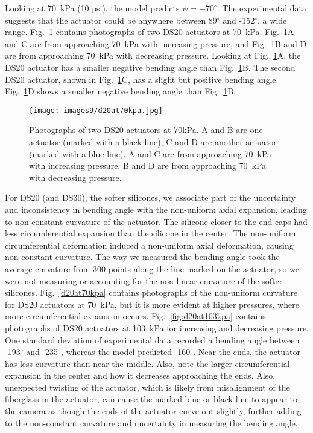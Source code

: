 Looking at 70~kPa (10 psi), the model predicts $\psi=-70^\circ$. The experimental data suggests that the actuator could be anywhere between 89$^\circ$ and -152$^\circ$, a wide range. Fig.~\ref{fig:d20at70kpa} contains photographs of two DS20 actuators at 70~kPa. Fig.~\ref{fig:d20at70kpa}A and C are from approaching 70~kPa with increasing pressure, and Fig.~\ref{fig:d20at70kpa}B and D are from approaching 70~kPa with decreasing pressure. Looking at Fig.~\ref{fig:d20at70kpa}A, the DS20 actuator has a smaller negative bending angle than Fig.~\ref{fig:d20at70kpa}B. The second DS20 actuator, shown in Fig.~\ref{fig:d20at70kpa}C, has a slight but positive bending angle. Fig.~\ref{fig:d20at70kpa}D shows a smaller negative bending angle than Fig.~\ref{fig:d20at70kpa}B. 

\begin{figure}[ht]
    \centering
     \texttt{[image: images9/d20at70kpa.jpg]}
    \caption{Photographs of two DS20 actuators at 70kPa. A and B are one actuator (marked with a black line), C and D are another actuator (marked with a blue line). A and C are from approaching 70~kPa with increasing pressure. B and D are from approaching 70~kPa with decreasing pressure.}
    \label{fig:d20at70kpa}
\end{figure}

For DS20 (and DS30), the softer silicones, we associate part of the uncertainty and inconsistency in bending angle with the non-uniform axial expansion, leading to non-constant curvature of the actuator. The silicone closer to the end caps had less circumferential expansion than the silicone in the center. The non-uniform circumferential deformation induced a non-uniform axial deformation, causing non-constant curvature. The way we measured the bending angle took the average curvature from 300 points along the line marked on the actuator, so we were not measuring or accounting for the non-linear curvature of the softer silicones. Fig.~\ref{d20at70kpa} contains photographs of the non-uniform curvature for DS20 actuators at 70~kPa, but it is more evident at higher pressures, where more circumferential expansion occurs. Fig.~\ref{fig:d20at103kpa} contains photographs of DS20 actuators at 103~kPa for increasing and decreasing pressure. One standard deviation of experimental data recorded a bending angle between -193$^\circ$ and -235$^\circ$, whereas the model predicted -160$^\circ$. Near the ends, the actuator has less curvature than near the middle. Also, note the larger circumferential expansion in the center and how it decreases approaching the ends. Also, unexpected twisting of the actuator, which is likely from misalignment of the fiberglass in the actuator, can cause the marked blue or black line to appear to the camera as though the ends of the actuator curve out slightly, further adding to the non-constant curvature and uncertainty in measuring the bending angle.

